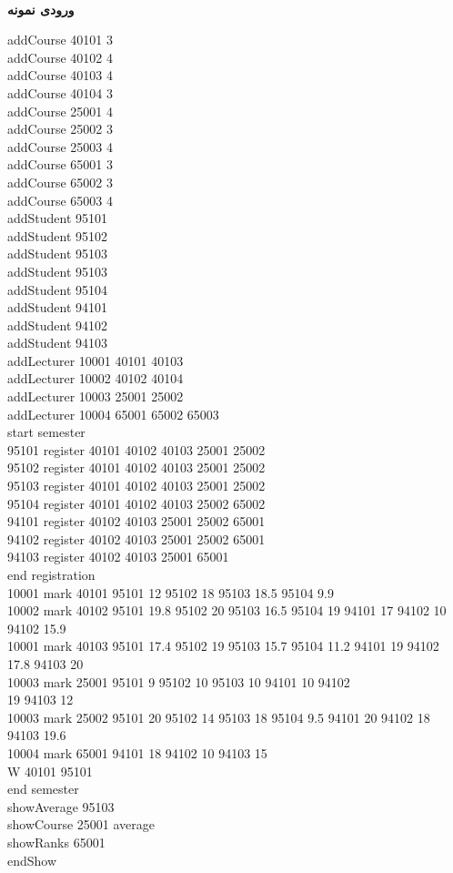 \documentclass[]{article}
\newcommand{\inputsample}[1]{
    ~\\
    \textbf{ورودی نمونه}
    ~\\
    \begin{tcolorbox}[breakable,boxrule=0pt]
        \begin{latin}
            \large{
                #1
            }
        \end{latin}
    \end{tcolorbox}
}
\begin{document}
\inputsample{
addCourse 40101 3\\
addCourse 40102 4\\
addCourse 40103 4\\
addCourse 40104 3\\
addCourse 25001 4\\
addCourse 25002 3\\
addCourse 25003 4\\
addCourse 65001 3\\
addCourse 65002 3\\
addCourse 65003 4\\
addStudent 95101\\
addStudent 95102\\
addStudent 95103\\
addStudent 95103\\
addStudent 95104\\
addStudent 94101\\
addStudent 94102\\
addStudent 94103\\
addLecturer 10001 40101 40103\\
addLecturer 10002 40102 40104\\
addLecturer 10003 25001 25002\\
addLecturer 10004 65001 65002 65003\\
start semester\\
95101 register 40101 40102 40103 25001 25002\\
95102 register 40101 40102 40103 25001 25002\\
95103 register 40101 40102 40103 25001 25002\\
95104 register 40101 40102 40103 25002 65002\\
94101 register 40102 40103 25001 25002 65001\\
94102 register 40102 40103 25001 25002 65001\\
94103 register 40102 40103 25001 65001\\
end registration\\
10001 mark 40101 95101 12 95102 18 95103 18.5 95104 9.9\\
10002 mark 40102 95101 19.8 95102 20 95103 16.5 95104 19 94101 17 94102 10 94102 15.9\\
10001 mark 40103 95101 17.4 95102 19 95103 15.7 95104 11.2
94101 19 94102 17.8 94103 20\\
10003 mark 25001 95101 9 95102 10 95103 10 94101 10 94102 \\
19 94103 12\\
10003 mark 25002 95101 20 95102 14 95103 18 95104 9.5 
94101 20 94102 18 94103 19.6\\
10004 mark 65001 94101 18 94102 10 94103 15\\
W 40101 95101\\
end semester\\
showAverage 95103\\
showCourse 25001 average\\
showRanks 65001\\
endShow 
}
\end{document}
